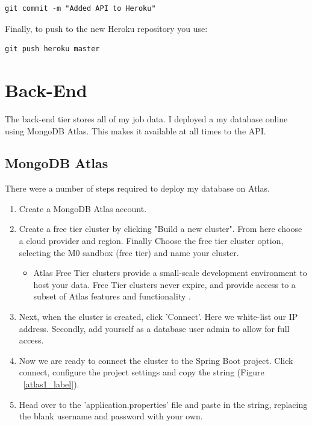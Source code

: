 \begin{verbatim}
git commit -m "Added API to Heroku"
\end{verbatim}
Finally, to push to the new Heroku repository you use:

\begin{verbatim}
git push heroku master
\end{verbatim}

\section{Back-End}
The back-end tier stores all of my job data. I deployed a my database online using MongoDB Atlas. This makes it available at all times to the API.

\subsection{MongoDB Atlas}
There were a number of steps required to deploy my database on Atlas.

\begin{enumerate}
    \item Create a MongoDB Atlas account.
    \item Create a free tier cluster by clicking "Build a new cluster". From here choose a cloud provider and region. Finally Choose the free tier cluster option, selecting the M0 sandbox (free tier) and name your cluster.
    \begin{itemize}
        \item Atlas Free Tier clusters provide a small-scale development environment to host your data. Free Tier clusters never expire, and provide access to a subset of Atlas features and functionality \cite{Atlas}.
    \end{itemize}
    \item Next, when the cluster is created, click 'Connect'. Here we white-list our IP address. Secondly, add yourself as a database user admin to allow for full access.
    \item Now we are ready to connect the cluster to the Spring Boot project. Click connect, configure the project settings and copy the string (Figure ~\ref{atlas1_label}).
    \item Head over to the 'application.properties' file and paste in the string, replacing the blank username and password with your own.
\end{enumerate}

